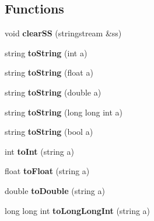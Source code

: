 \subsection*{Functions}
\begin{DoxyCompactItemize}
\item 
void {\bfseries clear\+SS} (stringstream \&ss)\hypertarget{namespacecommon_aa388eb4aec4a6c1fc25e4af17bcd35b6}{}\label{namespacecommon_aa388eb4aec4a6c1fc25e4af17bcd35b6}

\item 
string {\bfseries to\+String} (int a)\hypertarget{namespacecommon_ab967afcc3037e24ee78ecf6dd92688d5}{}\label{namespacecommon_ab967afcc3037e24ee78ecf6dd92688d5}

\item 
string {\bfseries to\+String} (float a)\hypertarget{namespacecommon_aadec8c454eaea8a3f16e153f9770552d}{}\label{namespacecommon_aadec8c454eaea8a3f16e153f9770552d}

\item 
string {\bfseries to\+String} (double a)\hypertarget{namespacecommon_ae206634061c636d23c21e2b86e6f4f47}{}\label{namespacecommon_ae206634061c636d23c21e2b86e6f4f47}

\item 
string {\bfseries to\+String} (long long int a)\hypertarget{namespacecommon_aa41a5dacf4897a60f6d4251d57a8404a}{}\label{namespacecommon_aa41a5dacf4897a60f6d4251d57a8404a}

\item 
string {\bfseries to\+String} (bool a)\hypertarget{namespacecommon_ad4970622daef780374effb8e47cf8134}{}\label{namespacecommon_ad4970622daef780374effb8e47cf8134}

\item 
int {\bfseries to\+Int} (string a)\hypertarget{namespacecommon_a31cd86456425bdd976cc622c5828e17f}{}\label{namespacecommon_a31cd86456425bdd976cc622c5828e17f}

\item 
float {\bfseries to\+Float} (string a)\hypertarget{namespacecommon_affd5ec1cd7889f6e63c8fde2c1db389d}{}\label{namespacecommon_affd5ec1cd7889f6e63c8fde2c1db389d}

\item 
double {\bfseries to\+Double} (string a)\hypertarget{namespacecommon_adeca0735c7b49feb339967ada8cde286}{}\label{namespacecommon_adeca0735c7b49feb339967ada8cde286}

\item 
long long int {\bfseries to\+Long\+Long\+Int} (string a)\hypertarget{namespacecommon_a9f91668221fb6afe69e9f8f517a4fe7c}{}\label{namespacecommon_a9f91668221fb6afe69e9f8f517a4fe7c}


\end{DoxyCompactItemize}
